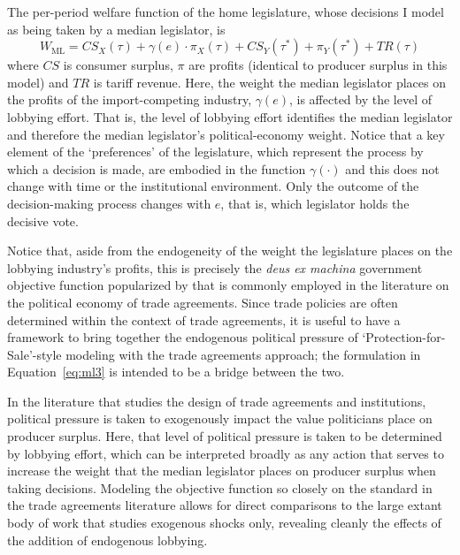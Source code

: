 \documentclass[authoryear, review]{elsarticle}
\newcommand{\ga}{\gamma}
\begin{document}

The per-period welfare function of the home legislature, whose decisions I model as being taken by a median legislator, is
\begin{equation}
  W_\text{ML} = \mathit{CS}_X(\tau) + \ga(e) \cdot \pi_X(\tau) + \mathit{CS}_Y(\tau^*) + \pi_Y(\tau^*) + \mathit{TR}(\tau)
  \label{eq:ml3}
\end{equation}
where $\mathit{CS}$ is consumer surplus, $\pi$ are profits (identical to producer surplus in this model) and $\mathit{TR}$ is tariff revenue. Here, the weight the median legislator places on the profits of the import-competing industry, $\ga(e)$, is affected by the level of lobbying effort. That is, the level of lobbying effort identifies the median legislator and therefore the median legislator's political-economy weight. Notice that a key element of the `preferences' of the legislature, which represent the process by which a decision is made, are embodied in the function $\ga(\cdot)$ and this does not change with time or the institutional environment. Only the outcome of the decision-making process changes with $e$, that is, which legislator holds the decisive vote.

Notice that, aside from the endogeneity of the weight the legislature places on the lobbying industry's profits, this is precisely the \textit{deus ex machina} government objective function popularized by \citet{baldwin} that is commonly employed in the literature on the political economy of trade agreements. Since trade policies are often determined within the context of trade agreements, it is useful to have a framework to bring together the endogenous political pressure of `Protection-for-Sale'-style modeling with the trade agreements approach; the formulation in Equation~\ref{eq:ml3} is intended to be a bridge between the two. 

In the literature that studies the design of trade agreements and institutions, political pressure is taken to exogenously impact the value politicians place on producer surplus. Here, that level of political pressure is taken to be determined by lobbying effort, which can be interpreted broadly as any action that serves to increase the weight that the median legislator places on producer surplus when taking decisions. Modeling the objective function so closely on the standard in the trade agreements literature allows for direct comparisons to the large extant body of work that studies exogenous shocks only, revealing cleanly the effects of the addition of endogenous lobbying.
\end{document}

